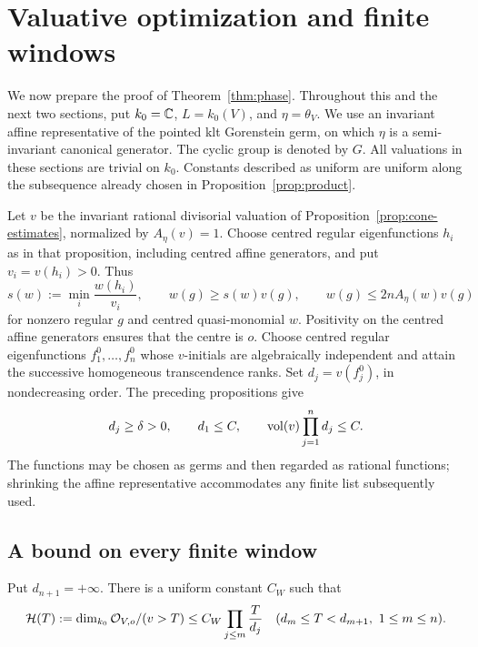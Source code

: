 \section{Valuative optimization and finite windows}
\label{sec:valuative}

We now prepare the proof of Theorem~\ref{thm:phase}. Throughout this and
the next two sections, put $k_0=\mathbb C$, $L=k_0(V)$, and $\eta=\theta_V$.
We use an invariant affine representative of the pointed klt Gorenstein
germ, on which $\eta$ is a semi-invariant canonical generator. The cyclic
group is denoted by $G$. All valuations in these sections are trivial on
$k_0$. Constants described as uniform are uniform along the subsequence
already chosen in Proposition~\ref{prop:product}.

Let $v$ be the invariant rational divisorial valuation of
Proposition~\ref{prop:cone-estimates}, normalized by $A_\eta(v)=1$.
Choose centred regular eigenfunctions $h_i$ as in that proposition,
including centred affine generators, and put $v_i=v(h_i)>0$. Thus
\begin{equation}\label{val:comparison}
 s(w):=\min_i\frac{w(h_i)}{v_i},\qquad
 w(g)\ge s(w)v(g),\qquad
 w(g)\le 2nA_\eta(w)v(g)
\end{equation}
for nonzero regular $g$ and centred quasi-monomial $w$. Positivity on
the centred affine generators ensures that the centre is $o$.
Choose centred regular eigenfunctions $f_1^0,\ldots,f_n^0$ whose
$v$-initials are algebraically independent and attain the successive
homogeneous transcendence ranks. Set $d_j=v(f_j^0)$, in nondecreasing
order. The preceding propositions give
\begin{equation}\label{val:degree-data}
 d_j\ge\delta>0,\qquad d_1\le C,\qquad
 \operatorname{vol}(v)\prod_{j=1}^n d_j\le C.
\end{equation}
The functions may be chosen as germs and then regarded as rational
functions; shrinking the affine representative accommodates any finite
list subsequently used.

\subsection{A bound on every finite window}

\begin{lemma}\label{val:window}
Put $d_{n+1}=+\infty$. There is a uniform constant $C_W$ such that
\begin{equation}\label{val:window-bound}
 \mathcal H(T):=\dim_{k_0}\mathcal O_{V,o}/(v>T)
 \le C_W\prod_{j\le m}\frac{T}{d_j}
 \quad(d_m\le T<d_{m+1},\ 1\le m\le n).
\end{equation}
\end{lemma}

